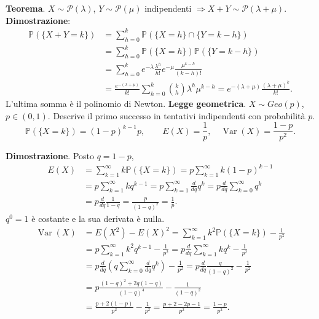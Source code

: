 \documentclass[11pt,a4paper]{article}
\newcommand{\pagina}[1]{\clearpage}
\begin{document}
\pagina{26}\textbf{Teorema}. $X\sim\mathcal P(\lambda)$, $Y\sim\mathcal P(\mu)$ indipendenti $\Rightarrow X+Y\sim\mathcal P(\lambda+\mu)$.
\textbf{Dimostrazione}:
\begin{align*}
\mathbb P(\{X+Y=k\})&=\sum_{h=0}^k\mathbb P(\{X=h\}\cap\{Y=k-h\})\\
&=\sum_{h=0}^k\mathbb P(\{X=h\})\mathbb P(\{Y=k-h\})\\
&=\sum_{h=0}^ke^{-\lambda}\frac{\lambda^h}{h!}e^{-\mu}\frac{\mu^{k-h}}{(k-h)!}\\
&=\frac{e^{-(\lambda+\mu)}}{k!}\sum_{h=0}^k\binom kh\lambda^h\mu^{k-h}=e^{-(\lambda+\mu)}\frac{(\lambda+\mu)^k}{k!}.
\end{align*}
L'ultima somma è il polinomio di Newton.
\textbf{Legge geometrica}. $X\sim Geo(p)$, $p\in(0,1)$. Descrive il primo successo in tentativi indipendenti con probabilità $p$.
\[\boxed{\mathbb P(\{X=k\})=(1-p)^{k-1}p},\qquad\boxed{E(X)=\frac1p,\quad\operatorname{Var}(X)=\frac{1-p}{p^2}}.\]
\begin{center}\end{center}
\textbf{Dimostrazione}. Posto $q=1-p$,
\begin{align*}
E(X)&=\sum_{k=1}^\infty k\mathbb P(\{X=k\})=p\sum_{k=1}^\infty k(1-p)^{k-1}\\
&=p\sum_{k=1}^\infty kq^{k-1}=p\sum_{k=1}^\infty\frac{d}{dq}q^k=p\frac{d}{dq}\sum_{k=0}^\infty q^k\\
&=p\frac{d}{dq}\frac1{1-q}=\frac{p}{(1-q)^2}=\frac1p.
\end{align*}
$q^0=1$ è costante e la sua derivata è nulla.
\begin{align*}
\operatorname{Var}(X)&=E(X^2)-E(X)^2=\sum_{k=1}^\infty k^2\mathbb P(\{X=k\})-\frac1{p^2}\\
&=p\sum_{k=1}^\infty k^2q^{k-1}-\frac1{p^2}=p\frac d{dq}\sum_{k=1}^\infty kq^k-\frac1{p^2}\\
&=p\frac d{dq}\left(q\sum_{k=0}^\infty\frac d{dq}q^k\right)-\frac1{p^2}
=p\frac d{dq}\frac q{(1-q)^2}-\frac1{p^2}\\
&=p\frac{(1-q)^2+2q(1-q)}{(1-q)^4}-\frac1{(1-q)^2}\\
&=\frac{p+2(1-p)}{p^2}-\frac1{p^2}=\frac{p+2-2p-1}{p^2}=\frac{1-p}{p^2}.
\end{align*}
\end{document}
